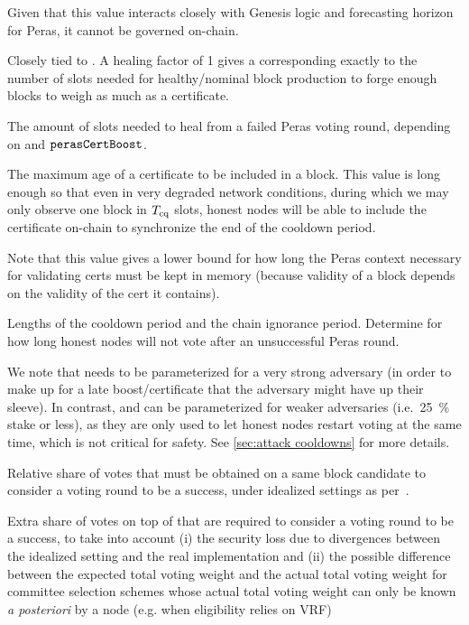 \begin{description}
  Given that this value interacts closely with Genesis logic and forecasting horizon for Peras, it cannot be governed on-chain.
\item[\perasHealingFactor]
  Closely tied to \perasHealingSlots. A healing factor of 1 gives a \perasHealingSlots{} corresponding exactly to the number of slots needed for healthy/nominal block production to forge enough blocks to weigh as much as a certificate.
\item[\perasHealingSlots]
  The amount of slots needed to heal from a failed Peras voting round, depending on \perasHealingFactor{} and $\mathtt{perasCertBoost}$.
\item[\perasCertMaxRounds]
  The maximum age of a certificate to be included in a block. This value is long enough so that even in very degraded network conditions, during which we may only observe one block in $T_{\text{cq}}$ slots, honest nodes will be able to include the certificate on-chain to synchronize the end of the cooldown period.

  Note that this value gives a lower bound for how long the Peras context necessary for validating certs must be kept in memory (because validity of a block depends on the validity of the cert it contains).
\item[\perasCooldownRounds, \perasIgnoranceRounds]
  Lengths of the cooldown period and the chain ignorance period.
  Determine for how long honest nodes will not vote after an unsuccessful Peras round.

  We note that \Theal{} needs to be parameterized for a very strong adversary (in order to make up for a late boost/certificate that the adversary might have up their sleeve).
  In contrast, \Tcq{} and \Tcp{} can be parameterized for weaker adversaries (i.e.~\qty{25}{\percent} stake or less), as they are only used to let honest nodes restart voting at the same time, which is not critical for safety.
  See \cref{sec:attack cooldowns} for more details.

\item[\perasQuorumBase]
  Relative share of votes that must be obtained on a same block candidate to consider a voting round to be a success, under idealized settings as per~\cite{badertscher2025peras}.
\item[\perasQuorumSafetyMargin]
  Extra share of votes on top of \perasQuorumBase{} that are required to consider a voting round to be a success, to take into account (i) the security loss due to divergences between the idealized setting and the real implementation and (ii) the possible difference between the expected total voting weight and the actual total voting weight for committee selection schemes whose actual total voting weight can only be known \textit{a posteriori} by a node (e.g. when eligibility relies on VRF)


\end{description}
